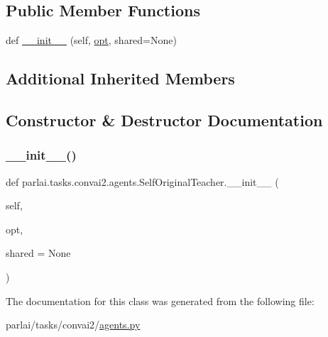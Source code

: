 \subsection*{Public Member Functions}
\begin{DoxyCompactItemize}
\item 
def \hyperlink{classparlai_1_1tasks_1_1convai2_1_1agents_1_1SelfOriginalTeacher_abcdf7f07251be2d5f52cd095c50d2fac}{\+\_\+\+\_\+init\+\_\+\+\_\+} (self, \hyperlink{classparlai_1_1core_1_1teachers_1_1FbDialogTeacher_af7a9ec497b9cd0292d7b8fa220da7c28}{opt}, shared=None)
\end{DoxyCompactItemize}
\subsection*{Additional Inherited Members}


\subsection{Constructor \& Destructor Documentation}
\mbox{\label{classparlai_1_1tasks_1_1convai2_1_1agents_1_1SelfOriginalTeacher_abcdf7f07251be2d5f52cd095c50d2fac}} 
\subsubsection{\texorpdfstring{\+\_\+\+\_\+init\+\_\+\+\_\+()}{\_\_init\_\_()}}
{\footnotesize\ttfamily def parlai.\+tasks.\+convai2.\+agents.\+Self\+Original\+Teacher.\+\_\+\+\_\+init\+\_\+\+\_\+ (\begin{DoxyParamCaption}\item[{}]{self,  }\item[{}]{opt,  }\item[{}]{shared = {\ttfamily None} }\end{DoxyParamCaption})}



The documentation for this class was generated from the following file\+:\begin{DoxyCompactItemize}
\item 
parlai/tasks/convai2/\hyperlink{parlai_2tasks_2convai2_2agents_8py}{agents.\+py}\end{DoxyCompactItemize}
